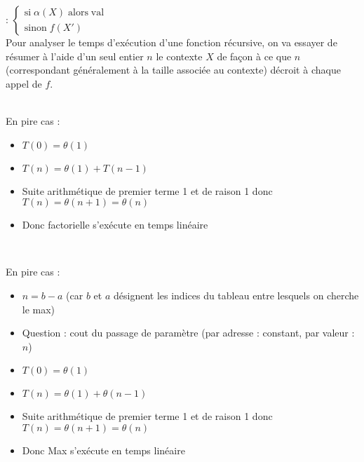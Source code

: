  : $\left\{ \begin{array}{l} 
	\mathrm{si} \; \alpha(X) \; \mathrm{alors} \; \mathrm{val} \\
	\mathrm{sinon} \; f(X') \end{array} \right.$ \\

 Pour analyser le temps d'exécution d'une fonction récursive, on va essayer de résumer à l'aide d'un seul entier $n$ le contexte $X$ de façon à ce que $n$ (correspondant généralement à la taille associée au contexte) décroit à chaque appel de $f$. \\

 \\

En pire cas : 
\begin{itemize}
	\item $T(0) = \theta(1)$
	\item $T(n) = \theta(1) + T(n-1)$
	\item Suite arithmétique de premier terme 1 et de raison 1 donc $T(n) = \theta(n+1) = \theta(n)$
	\item Donc factorielle s'exécute en temps linéaire
\end{itemize}

\newpage

 \\

En pire cas :
\begin{itemize}
	\item $n = b - a$ (car $b$ et $a$ désignent les indices du tableau entre lesquels on cherche le max)
	\item Question : cout du passage de paramètre (par adresse : constant, par valeur : $n$) 
	\item $T(0) = \theta(1)$
	\item $T(n) = \theta(1) + \theta(n-1)$
	\item Suite arithmétique de premier terme 1 et de raison 1 donc $T(n) = \theta(n+1) = \theta(n)$
	\item Donc Max s'exécute en temps linéaire
\end{itemize}

